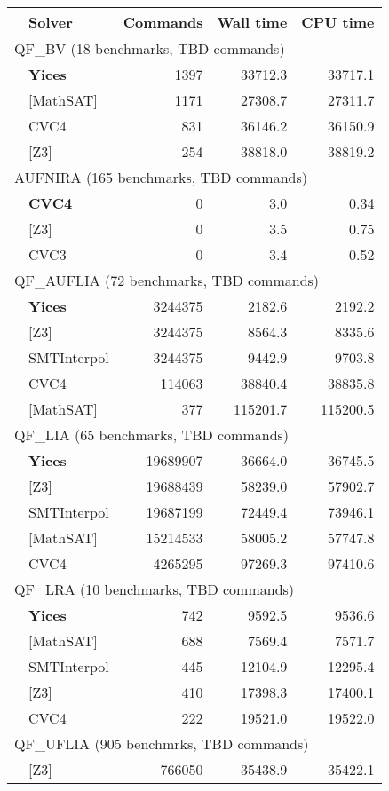 \begin{tabular}{|p{.1in}l|rrr|}
\hline
 & Solver & Commands & Wall time & CPU time \\
\hline
\multicolumn{5}{|l|}{QF\_BV (18 benchmarks, TBD commands)} \\
& \textbf{Yices} & 1397 & 33712.3 & 33717.1 \\
& [MathSAT] & 1171 & 27308.7 & 27311.7 \\
& CVC4 & 831 & 36146.2 & 36150.9 \\
& [Z3] & 254 & 38818.0 & 38819.2 \\
\hline
\multicolumn{5}{|l|}{AUFNIRA (165 benchmarks, TBD commands)} \\
& \textbf{CVC4} & 0 & 3.0 & 0.34 \\
& [Z3] & 0 & 3.5 & 0.75 \\
& CVC3 & 0 & 3.4 & 0.52 \\
\hline
\multicolumn{5}{|l|}{QF\_AUFLIA (72 benchmarks, TBD commands)} \\
& \textbf{Yices} & 3244375 & 2182.6 & 2192.2 \\
& [Z3] & 3244375 & 8564.3 & 8335.6 \\
& SMTInterpol & 3244375 & 9442.9 & 9703.8 \\
& CVC4 & 114063 & 38840.4 & 38835.8 \\
& [MathSAT] & 377 & 115201.7 & 115200.5 \\
\hline
\multicolumn{5}{|l|}{QF\_LIA (65 benchmarks, TBD commands)} \\
& \textbf{Yices} & 19689907 & 36664.0 & 36745.5 \\
& [Z3] & 19688439 & 58239.0 & 57902.7 \\
& SMTInterpol & 19687199 & 72449.4 & 73946.1 \\
& [MathSAT] & 15214533 & 58005.2 & 57747.8 \\
& CVC4 & 4265295 & 97269.3 & 97410.6 \\
\hline
\multicolumn{5}{|l|}{QF\_LRA (10 benchmarks, TBD commands)} \\
& \textbf{Yices} & 742 & 9592.5 & 9536.6 \\
& [MathSAT] & 688 & 7569.4 & 7571.7 \\
& SMTInterpol & 445 & 12104.9 & 12295.4 \\
& [Z3] & 410 & 17398.3 & 17400.1 \\
& CVC4 & 222 & 19521.0 & 19522.0 \\
\hline
\multicolumn{5}{|l|}{QF\_UFLIA (905 benchmrks, TBD commands)} \\
& [Z3] & 766050 & 35438.9 & 35422.1 \\

\end{tabular}
